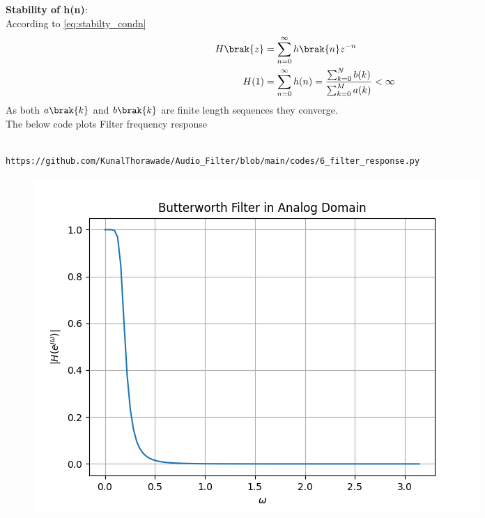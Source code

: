 \documentclass[journal,12pt,twocolumn]{IEEEtran}
\theoremstyle{remark}
\begin{document}
\begin{enumerate}[label=\thesection.\arabic*]
																																																																																													\textbf{Stability of h(n)}:\\
																																																																																													According to \eqref{eq:stabilty_condn}
																																																																																													\begin{align}
																																																																																													H\brak{z} &= \sum_{n = 0}^{\infty} h\brak{n}z^{-n}\\
																																																																																													H(1)&= \sum_{n = 0}^{\infty}h(n)  = \frac{\sum_{k = 0}^{N}b(k)}{\sum_{k = 0}^{M}a(k)}< \infty
																																																																																													\end{align}
																																																																																													As both $a\brak{k}$ and $b\brak{k}$ are finite length sequences they converge.\\
																																																																																													The below code plots Filter frequency response
																																																																																													\begin{lstlisting}
																																																																																													https://github.com/KunalThorawade/Audio_Filter/blob/main/codes/6_filter_response.py
																																																																																													\end{lstlisting}
																																																																																													\begin{figure}[H]
																																																																																													\centering
																																																																																													\includegraphics[width=1\columnwidth]{figs/Filter_Response.png}

\end{figure}
\end{enumerate}
\end{document}
